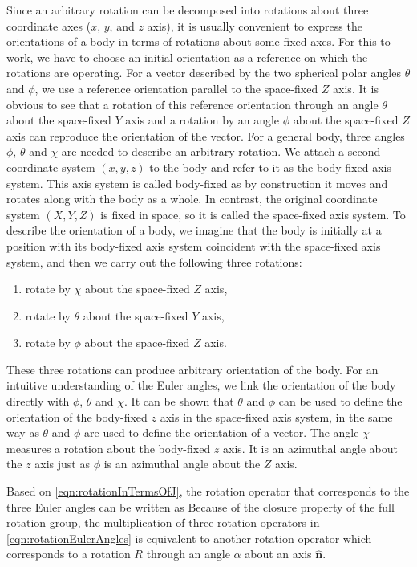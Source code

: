 Since an arbitrary rotation can be decomposed into rotations about three coordinate axes ($x$, $y$, and $z$ axis), 
it is usually convenient to express the orientations of a body in terms of rotations about some fixed axes. For this to 
work, we have to choose an initial orientation as a reference on which the rotations are operating. 
For a vector described by the two spherical polar angles $\theta$ and $\phi$, we use a reference orientation parallel 
to the space-fixed $Z$ axis. It is obvious to see that a rotation of this reference orientation through an angle $\theta$ about 
the space-fixed $Y$ axis and a rotation by an angle $\phi$ about the space-fixed $Z$ axis can reproduce the 
orientation of the vector. For a general body, three angles $\phi$, $\theta$ and $\chi$ are needed to
 describe an arbitrary rotation.
We attach a second coordinate system 
$(x, y, z)$ to the body and refer to it as the body-fixed axis system. This axis system is called 
body-fixed as by construction it moves and rotates along with the body as a whole. 
In contrast, the original coordinate system $(X, Y, Z)$ is fixed in space, so it is called the space-fixed axis system. 
To describe the orientation of a body, we imagine that the body is initially at a position with its body-fixed axis system
 coincident with the space-fixed axis system, and then we carry out the following three rotations:
\begin{enumerate}
  \item rotate by $\chi$ about the space-fixed $Z$ axis, 
  \item  rotate by $\theta$ about the space-fixed $Y$ axis,
  \item  rotate by $\phi$ about the space-fixed $Z$ axis. 
\end{enumerate}
These three rotations can produce arbitrary orientation of the body. For an intuitive understanding of the Euler 
angles, we link the orientation of the body directly with $\phi$, $\theta$ and $\chi$. It can be shown that $\theta$ and
$\phi$ can be used to define the orientation of the body-fixed $z$ axis in the space-fixed axis system,  in the same way as
$\theta$ and $\phi$ are used to define the orientation of a vector. The angle $\chi$ measures a rotation about the 
body-fixed $z$ axis. It is an azimuthal angle about the $z$ axis just as $\phi$ is an azimuthal angle about the $Z$ axis. 

Based on \autoref{eqn:rotationInTermsOfJ}, the rotation operator that corresponds to the three Euler angles can be 
written as
Because of the closure property of the full rotation group, the multiplication of three rotation operators in 
\autoref{eqn:rotationEulerAngles} is equivalent to another rotation operator
which corresponds to a rotation $R$  through an angle $\alpha$ about an axis $\mathbf{\hat{n}}$. 

